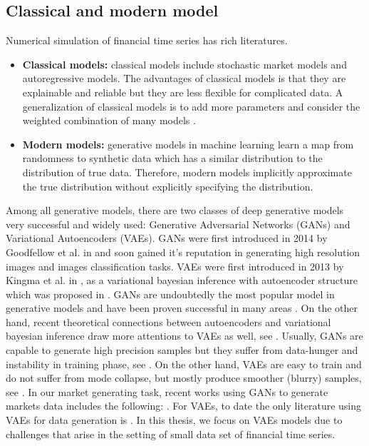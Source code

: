 \documentclass[12pt]{report}
\theoremstyle{definition}
\theoremstyle{remark}
\begin{document}
\subsection{Classical and modern model}
Numerical simulation of financial time series has rich literatures.
\begin{itemize}
  \item \textbf{Classical models:} classical models include stochastic market models and autoregressive models. The advantages of classical models is that they are explainable and reliable but they are less flexible for complicated data. A generalization of classical models is to add more parameters and consider the weighted combination of many models \cite{duembgen2014estimate}. 
  \item \textbf{Modern models:} generative models in machine learning learn a map from randomness to synthetic data which has a similar distribution to the distribution of true data. Therefore, modern models implicitly approximate the true distribution without explicitly specifying the distribution. 
\end{itemize}
Among all generative models, there are two classes of deep generative models very successful and widely used: Generative Adversarial Networks (GANs) and Variational Autoencoders (VAEs). GANs were first introduced in 2014 by Goodfellow et al. in \cite{mirza2014conditional} and soon gained it's reputation in generating high resolution images and images classification tasks. VAEs were first introduced in 2013 by Kingma et al. in \cite{kingma2013auto}, as a variational bayesian inference with autoencoder structure which was proposed in \cite{ballard1987modular}. GANs are undoubtedly the most popular model in generative models and have been proven successful in many areas . On the other hand, recent theoretical connections between autoencoders and variational bayesian inference draw more attentions to VAEs as well, see \cite{kingma2019introduction}. Usually, GANs are capable to generate high precision samples but they suffer from data-hunger and instability in training phase, see \cite{arjovsky2017towards}. On the other hand, VAEs are easy to train and do not suffer from mode collapse, but mostly produce smoother (blurry) samples, see \cite{karras2017progressive}. In our market generating task, recent works using GANs to generate markets data includes the following: \cite{bonnier2019deep, cuchiero2020generative, henry2019generative, buehler2019deep, wiese2020quant, xu2020cot}. For VAEs, to date the only literature using VAEs for data generation is \cite{buehler2020data}. In this thesis, we focus on VAEs models due to challenges that arise in the setting of small data set of financial time series.
\end{document}
